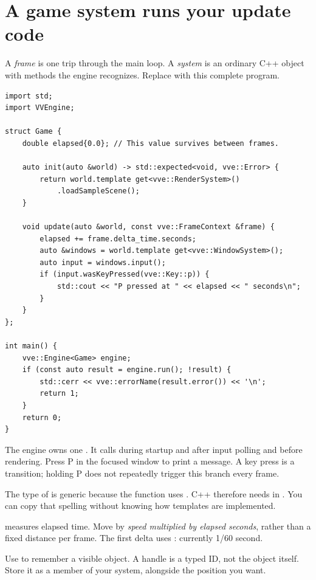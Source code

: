 \documentclass[11pt,a4paper]{article}
\begin{document}
\section{A game system runs your update code}
A \emph{frame} is one trip through the main loop. A \emph{system} is an ordinary C++ object with methods the engine recognizes. Replace  with this complete program.
\begin{lstlisting}
import std;
import VVEngine;

struct Game {
    double elapsed{0.0}; // This value survives between frames.

    auto init(auto &world) -> std::expected<void, vve::Error> {
        return world.template get<vve::RenderSystem>()
            .loadSampleScene();
    }

    void update(auto &world, const vve::FrameContext &frame) {
        elapsed += frame.delta_time.seconds;
        auto &windows = world.template get<vve::WindowSystem>();
        auto input = windows.input();
        if (input.wasKeyPressed(vve::Key::p)) {
            std::cout << "P pressed at " << elapsed << " seconds\n";
        }
    }
};

int main() {
    vve::Engine<Game> engine;
    if (const auto result = engine.run(); !result) {
        std::cerr << vve::errorName(result.error()) << '\n';
        return 1;
    }
    return 0;
}
\end{lstlisting}
The engine owns one . It calls  during startup and  after input polling and before rendering. Press P in the focused window to print a message. A key press is a transition; holding P does not repeatedly trigger this branch every frame.

The type of  is generic because the function uses . C++ therefore needs  in . You can copy that spelling without knowing how templates are implemented.

 measures elapsed time. Move by \emph{speed multiplied by elapsed seconds}, rather than a fixed distance per frame. The first delta uses : currently 1/60 second.

Use  to remember a visible object. A handle is a typed ID, not the object itself. Store it as a member of your system, alongside the position you want.
\end{document}
